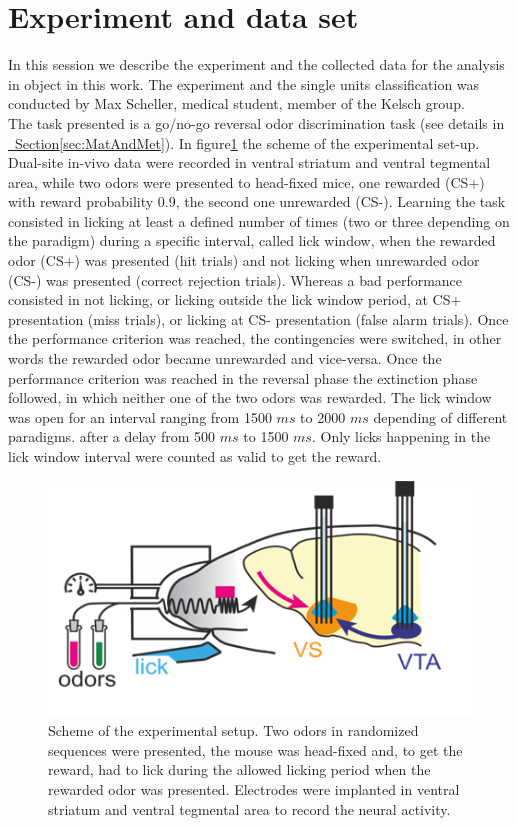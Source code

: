 \section{Experiment and data set}
\label{sec:Dataset}
In this session we describe the experiment and the collected data for the analysis in object in this work. The experiment and the single units classification was conducted by Max Scheller, medical student, member of the Kelsch group.\\
The task presented is a go/no-go reversal odor discrimination task (see details in \hyperref[sec:MatAndMet]{~Section\ref*{sec:MatAndMet}}). In figure\ref{fig:experiment} the scheme of the experimental set-up. Dual-site in-vivo data were recorded in ventral striatum and ventral tegmental area, while two odors were presented to head-fixed mice, one rewarded (CS+) with reward probability 0.9, the second one unrewarded (CS-). Learning the task consisted in licking at least a defined number of times (two or three depending on the paradigm) during a specific interval, called lick window, when the rewarded odor (CS+) was presented (hit trials) and not licking when unrewarded odor (CS-) was presented (correct rejection trials). Whereas a bad performance consisted in not licking, or licking outside the lick window period, at CS+ presentation (miss trials), or licking at CS- presentation (false alarm trials). Once the performance criterion was reached, the contingencies were switched, in other words the rewarded odor became unrewarded and vice-versa. Once the performance criterion was reached in the reversal phase the extinction phase followed, in which neither one of the two odors was rewarded. The lick window was open for an interval ranging from 1500 $ms$ to 2000 $ms$ depending of different paradigms. after a delay from 500 $ms$ to 1500 $ms$. Only licks happening in the lick window interval were counted as valid to get the reward.\\
\begin{figure}
    \centering
    \includegraphics[scale=1]{figures/Experiment.png}
    \caption{Scheme of the experimental setup. Two odors in randomized sequences were presented, the mouse was head-fixed and, to get the reward, had to lick during the allowed licking period when the rewarded odor was presented. Electrodes were implanted in ventral striatum and ventral tegmental area to record the neural activity. }
    \label{fig:experiment}
\end{figure}

